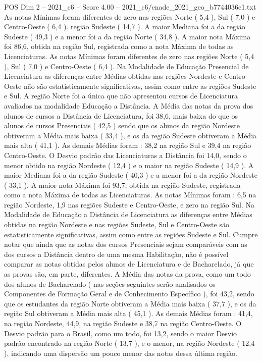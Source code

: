 \begin{textsample}{POS Dim 2 – 2021\_c6 – Score 4.00 – 2021\_c6/enade\_2021\_geo\_b7744036e1.txt}
As notas Mínimas foram diferentes de zero nas regiões Norte ( 5,4 ), Sul ( 7,0 ) e Centro-Oeste ( 6,4 ). região Sudeste ( 14,7 ).
A maior Mediana foi a da região Sudeste ( 49,3 ) e a menor foi a da região Norte ( 34,8 ).
A maior nota Máxima foi 86,6, obtida na região Sul, registrada como a nota Máxima de todas as Licenciaturas.
As notas Mínimas foram diferentes de zero nas regiões Norte ( 5,4 ), Sul ( 7,0 ) e Centro-Oeste ( 6,4 ).
Na Modalidade de Educação Presencial de Licenciatura as diferenças entre Médias obtidas nas regiões Nordeste e Centro-Oeste não são estatisticamente significativas, assim como entre as regiões Sudeste e Sul.
A região Norte foi a única que não apresentou cursos de Licenciatura avaliados na modalidade Educação a Distância.
A Média das notas da prova dos alunos de cursos a Distância de Licenciatura, foi 38,6, mais baixa do que os alunos de cursos Presenciais ( 42,5 ) sendo que os alunos da região Nordeste obtiveram a Média mais baixa ( 33,4 ), e os da região Sudeste obtiveram a Média mais alta ( 41,1 ).
As demais Médias foram : 38,2 na região Sul e 39,4 na região Centro-Oeste.
O Desvio padrão das Licenciaturas a Distância foi 14,0, sendo o menor obtido na região Nordeste ( 12,4 ) e o maior na região Sudeste ( 14,9 ).
A maior Mediana foi a da região Sudeste ( 40,3 ) e a menor foi a da região Nordeste ( 33,1 ).
A maior nota Máxima foi 93,7, obtida na região Sudeste, registrada como a nota Máxima de todas as Licenciaturas.
As notas Mínimas foram : 6,5 na região Nordeste, 1,9 nas regiões Sudeste e Centro-Oeste, e zero na região Sul.
Na Modalidade de Educação a Distância de Licenciatura as diferenças entre Médias obtidas na região Nordeste e nas regiões Sudeste, Sul e Centro-Oeste são estatisticamente significativas, assim como entre as regiões Sudeste e Sul.
Cumpre notar que ainda que as notas dos cursos Presenciais sejam comparáveis com as dos cursos a Distância dentro de uma mesma Habilitação, não é possível comparar as notas obtidas pelos alunos de Licenciatura e de Bacharelado, já que as provas são, em parte, diferentes.
A Média das notas da prova, como um todo dos alunos de Bacharelado ( nas seções seguintes serão analisados os Componentes de Formação Geral e de Conhecimento Específico ), foi 43,2, sendo que os estudantes da região Norte obtiveram a Média mais baixa ( 37,7 ), e os da região Sul obtiveram a Média mais alta ( 45,1 ).
As demais Médias foram : 41,4, na região Nordeste, 44,9, na região Sudeste e 38,7 na região Centro-Oeste.
O Desvio padrão para o Brasil, como um todo, foi 13,2, sendo o maior Desvio padrão encontrado na região Norte ( 13,7 ), e o menor, na região Nordeste ( 12,4 ), indicando uma dispersão um pouco menor das notas dessa última região.

\end{textsample}
